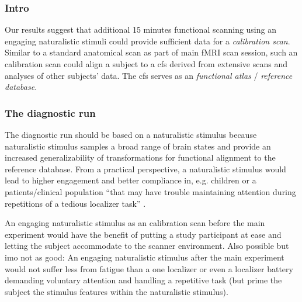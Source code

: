 




\subsubsection{Intro}



%
Our results suggest that additional 15 minutes functional scanning using an
engaging naturalistic stimuli could provide sufficient data for a
\textit{calibration scan}.
%
Similar to a standard anatomical scan as part of main fMRI scan session, such an
calibration scan could align a subject to a \ac{cfs} derived from extensive
scans and analyses of other subjects' data.
%
The \ac{cfs} serves as an \textit{functional atlas} / \textit{reference
database}.


\subsubsection{The diagnostic run}
%
The diagnostic run should be based on a naturalistic stimulus because
naturalistic stimulus samples a broad range of brain states
\citep[cf.][]{guntupalli2016model, haxby2011common} and provide an increased
generalizability of transformations for functional alignment to the reference
database.
%
From a practical perspective, a naturalistic stimulus would lead to higher
engagement and better compliance \citep{vanderwal2015inscapes,
eickhoff2020towards} in, e.g. children or a patients/clinical population ``that
may have trouble maintaining attention during repetitions of a tedious localizer
task'' \citep{jiahui2020predicting}.

An engaging naturalistic stimulus as an calibration scan before the main
experiment would have the benefit of putting a study participant at ease and
letting the subject accommodate to the scanner environment.
%
Also possible but imo not as good: An engaging naturalistic stimulus after the
main experiment would not suffer less from fatigue than a one localizer or even
a localizer battery demanding voluntary attention and handling a repetitive task
(but prime the subject the stimulus features within the naturalistic stimulus).

